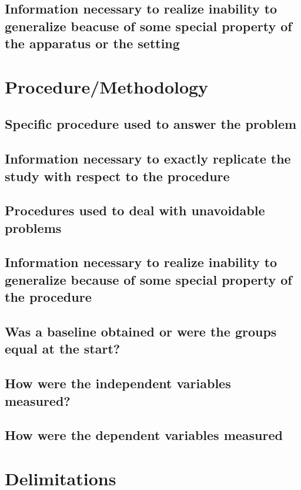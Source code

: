 \documentclass[12pt,oneside,letterpaper]{article}
\begin{document}
\subsection{Information necessary to realize inability to generalize beacuse of
  some special property of the apparatus or the setting}

\section{Procedure/Methodology}

\subsection{Specific procedure used to answer the problem}

\subsection{Information necessary to exactly replicate the study with respect to
  the procedure}

\subsection{Procedures used to deal with unavoidable problems}

\subsection{Information necessary to realize inability to generalize because of
  some special property of the procedure}

\subsection{Was a baseline obtained or were the groups equal at the start?}

\subsection{How were the independent variables measured?}

\subsection{How were the dependent variables measured}

\section{Delimitations}
\end{document}
